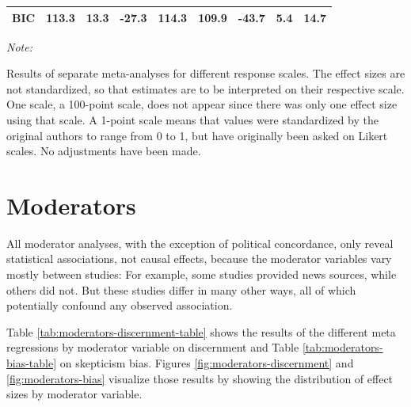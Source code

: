 \documentclass[
  man]{apa6}
\begin{document}
\begin{table}
{\begin{threeparttable}
\begin{tabular}[t]{lcccccccc}
\hspace{1em}BIC & 113.3 & 13.3 & -27.3 & 114.3 & 109.9 & -43.7 & 5.4 & 14.7\\
\bottomrule
\end{tabular}
\begin{tablenotes}
\item \textit{Note: } 
\item Results of separate meta-analyses for different response scales. The effect sizes are not standardized, so that estimates are to be interpreted on their respective scale. One scale, a 100-point scale, does not appear since there was only one effect size using that scale. A 1-point scale means that values were standardized by the original authors to range from 0 to 1, but have originally been asked on Likert scales. No adjustments have been made.
\end{tablenotes}
\end{threeparttable}}
\end{table}

\clearpage

\section{Moderators}\label{moderators}

\FloatBarrier

All moderator analyses, with the exception of political concordance, only reveal statistical associations, not causal effects, because the moderator variables vary mostly between studies: For example, some studies provided news sources, while others did not. But these studies differ in many other ways, all of which potentially confound any observed association.

Table \ref{tab:moderators-discernment-table} shows the results of the different meta regressions by moderator variable on discernment and Table \ref{tab:moderators-bias-table} on skepticism bias. Figures \ref{fig:moderators-discernment} and \ref{fig:moderators-bias} visualize those results by showing the distribution of effect sizes by moderator variable.
\end{document}
